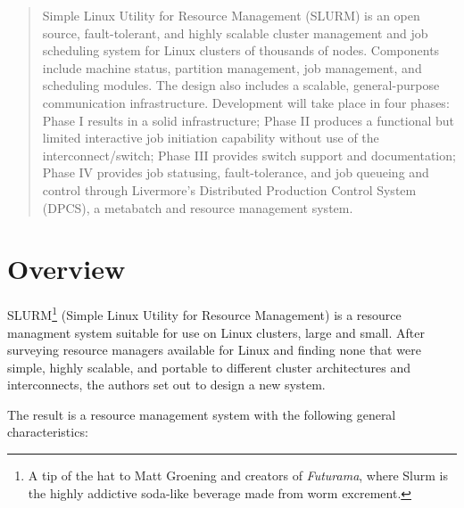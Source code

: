 \maketitle

\begin{abstract}
Simple Linux Utility for Resource Management (SLURM) is an open source,
fault-tolerant, and highly scalable cluster management and job 
scheduling system for Linux clusters of 
thousands of nodes.  Components include machine status, partition
management, job management, and scheduling modules.  The design also 
includes a scalable, general-purpose communication infrastructure.
Development will take place in four phases:  Phase I results in a solid
infrastructure;  Phase II produces a functional but limited interactive 
job initiation capability without use of the interconnect/switch; 
Phase III provides switch support and documentation; Phase IV provides 
job statusing, fault-tolerance, and job queueing and control through  
Livermore's Distributed Production Control System (DPCS), a metabatch and
resource management system.
\end{abstract}

\vspace{0.25in}


\newpage



\section{Overview}

SLURM\footnote{A tip of the hat to Matt Groening and creators of {\em Futurama},
where Slurm is the highly addictive soda-like beverage made from worm
excrement.} (Simple Linux Utility for Resource Management) 
is a resource managment 
system suitable for use on Linux clusters, large and small.  After 
surveying\cite{Jette2002} resource managers available for Linux and finding 
none that were simple, highly scalable, and portable to different cluster 
architectures and interconnects, the authors set out to design a new system.

The result is a resource management system with the following general
characteristics:

